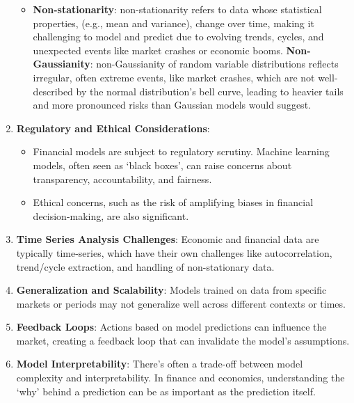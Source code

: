 \documentclass[11pt, reqno]{amsart}
\theoremstyle{definition}
\theoremstyle{remark}
\begin{document}
\begin{enumerate}
\begin{itemize}
        \item \textbf{Non-stationarity}: non-stationarity refers to data whose statistical
          properties, (e.g., mean and variance), change over time, making it
          challenging to model and predict due to evolving trends, cycles, and
          unexpected events like market crashes or economic booms. \textbf{Non-Gaussianity}:
          non-Gaussianity of random variable distributions reflects irregular,
          often extreme events, like market crashes, which are not well-described
          by the normal distribution's bell curve, leading to heavier tails and more
          pronounced risks than Gaussian models would suggest.
      \end{itemize}

    \item \textbf{Regulatory and Ethical Considerations}:
      \begin{itemize}
        \item Financial models are subject to regulatory scrutiny. Machine
          learning models, often seen as `black boxes', can raise concerns about
          transparency, accountability, and fairness.

        \item Ethical concerns, such as the risk of amplifying biases in
          financial decision-making, are also significant.
      \end{itemize}

    \item \textbf{Time Series Analysis Challenges}: Economic and financial data are
      typically time-series, which have their own challenges like
      autocorrelation, trend/cycle extraction, and handling of non-stationary
      data.

    \item \textbf{Generalization and Scalability}: Models trained on data from specific
      markets or periods may not generalize well across different contexts or times.

    \item \textbf{Feedback Loops}: Actions based on model predictions can influence
      the market, creating a feedback loop that can invalidate the model's
      assumptions.

    \item \textbf{Model Interpretability}: There's often a trade-off between model
      complexity and interpretability. In finance and economics, understanding the
      `why' behind a prediction can be as important as the prediction itself.
  \end{enumerate}
\end{document}
